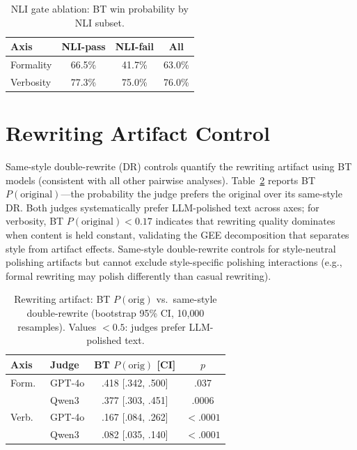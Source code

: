 \begin{table}[h]
\centering
\small
\caption{NLI gate ablation: BT win probability by NLI subset.}
\label{tab:nli_ablation}
\begin{tabular}{lccc}
\toprule
Axis & NLI-pass & NLI-fail & All \\
\midrule
Formality & 66.5\% & 41.7\% & 63.0\% \\
Verbosity & 77.3\% & 75.0\% & 76.0\% \\
\bottomrule
\end{tabular}
\end{table}

\section{Rewriting Artifact Control}
\label{app:artifact_control}

Same-style double-rewrite (DR) controls quantify the rewriting artifact using BT models (consistent with all other pairwise analyses).
Table~\ref{tab:artifact} reports BT $P(\text{original})$---the probability the judge prefers the original over its same-style DR.
Both judges systematically prefer LLM-polished text across axes; for verbosity, BT $P(\text{original}) < 0.17$ indicates that rewriting quality dominates when content is held constant, validating the GEE decomposition that separates style from artifact effects.
Same-style double-rewrite controls for style-neutral polishing artifacts but cannot exclude style-specific polishing interactions (e.g., formal rewriting may polish differently than casual rewriting).

\begin{table}[h]
\centering
\small
\caption{Rewriting artifact: BT $P(\text{orig})$ vs.\ same-style double-rewrite (bootstrap 95\% CI, 10{,}000 resamples). Values ${<}0.5$: judges prefer LLM-polished text.}
\label{tab:artifact}
\begin{tabular}{@{}llcc@{}}
\toprule
Axis & Judge & BT $P(\text{orig})$ [CI] & $p$ \\
\midrule
Form.\ & GPT-4o & .418 [.342, .500] & .037 \\
 & Qwen3 & .377 [.303, .451] & .0006 \\
\midrule
Verb.\ & GPT-4o & .167 [.084, .262] & ${<}.0001$ \\
 & Qwen3 & .082 [.035, .140] & ${<}.0001$ \\
\bottomrule
\end{tabular}
\end{table}

